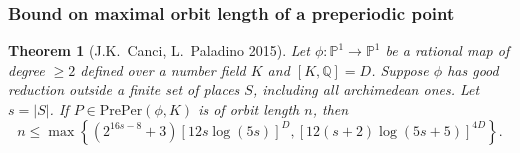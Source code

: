 \documentclass{beamer}
\def\PP{{\mathbb P}}
\def\QQ{{\mathbb Q}}
\theoremstyle{thmstyle}
\newtheorem*{mythm}{Theorem}
\theoremstyle{mystyle}
\newtheorem*{remark}{Remark}
\theoremstyle{qstnstyle}
\begin{document}





\begin{frame}
\frametitle{Bound on maximal orbit length of a preperiodic point }
\begin{mythm}[J.K.\ Canci, L.\ Paladino 2015]
Let $\phi : \PP^1\to\PP^1$ be a rational map of degree $\geq{2}$
defined over a number field $K$ and $[K, \mathbb{Q}]=D$. 
Suppose $\phi$ has good reduction outside a finite set of places $S$, including all archimedean ones. Let $s=|S|$.
If $P\in\text{PrePer}(\phi,K)$ is of orbit length $n$, then
$$n\leq \max\left\{(2^{16s-8}+3)\left[12s\log(5s)\right]^{D}, \left[12(s+2)\log(5s+5)\right]^{4D}\right\}
.$$
\end{mythm}
\end{frame}




%
%
%
%
\end{document}
